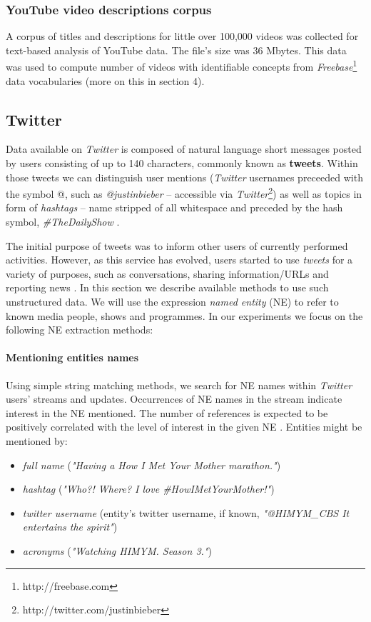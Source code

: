 \subsubsection{YouTube video descriptions corpus}

A corpus of titles and descriptions for little over 100,000 videos was collected
for text-based analysis of YouTube data. The file's size was 36 Mbytes. This
data was used to compute number of videos with identifiable concepts from
\textit{Freebase}\footnote{http://freebase.com} data vocabularies (more on this in section 4).

\subsection{Twitter}

Data available on \textit{Twitter} is composed of natural language short messages posted by users
consisting of up to 140 characters, commonly known as \textbf{tweets}. Within
those tweets we can distinguish user mentions (\textit{Twitter} usernames preceeded with the symbol @,
such as \textit{@justinbieber} -- accessible via \textit{Twitter}\footnote{http://twitter.com/justinbieber}) as well as topics in form of \textit{hashtags} -- name stripped of all whitespace
and preceded by the hash symbol, \eg \textit{\#TheDailyShow} \cite{edinburg-corpus}.

The initial purpose of tweets was to inform other users of currently performed activities. However, as this service has
evolved, users started to use \textit{tweets} for a variety of purposes, such as conversations,
sharing information/URLs and reporting news \cite{why-we-twitter, twitter-content-is-it}. In this section we describe available methods to use such unstructured data. We will use the expression \textit{named entity} (NE) to refer to
known media people, shows and programmes.
In our experiments we focus on the following NE extraction methods:

\paragraph{Mentioning entities names}
Using simple string matching methods, we search for NE names within \textit{Twitter} users' streams and updates.
Occurrences of NE names in the stream indicate interest in the NE mentioned. The
number of references is expected to be positively correlated with the level of interest in the given NE \cite{twitter-content-is-it}.
Entities might be mentioned by:
\begin{itemize}
  \item \textit{full name} (\eg \textit{"Having a How I Met Your Mother marathon."})
  \item \textit{hashtag} (\eg \textit{"Who?! Where? I love \#HowIMetYourMother!"})
  \item \textit{twitter username} (entity's twitter username, if known, \eg \textit{"@HIMYM\_CBS It entertains the spirit"})
  \item \textit{acronyms} (\eg \textit{"Watching HIMYM. Season 3."})
\end{itemize}
